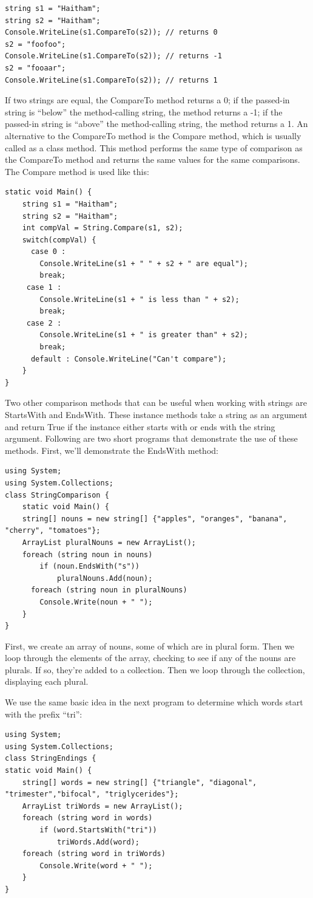 \documentclass[12pt,a4paper,final,twoside,titlepage]{book}
\begin{document}
\begin{lstlisting}
string s1 = "Haitham";
string s2 = "Haitham";
Console.WriteLine(s1.CompareTo(s2)); // returns 0
s2 = "foofoo";
Console.WriteLine(s1.CompareTo(s2)); // returns -1
s2 = "fooaar";
Console.WriteLine(s1.CompareTo(s2)); // returns 1
\end{lstlisting}
If two strings are equal, the CompareTo method returns a 0; if the passed-in string is “below” the method-calling string, the method returns a -1; if the passed-in string is “above” the method-calling string, the method returns a 1.
An alternative to the CompareTo method is the Compare method, which is usually called as a class method. This method performs the same type of comparison as the CompareTo method and returns the same values for the same comparisons. The Compare method is used like this:
\begin{lstlisting}
static void Main() {
	string s1 = "Haitham";
	string s2 = "Haitham";
	int compVal = String.Compare(s1, s2); 
	switch(compVal) {
      case 0 : 
      	Console.WriteLine(s1 + " " + s2 + " are equal");
      	break;
     case 1 : 
     	Console.WriteLine(s1 + " is less than " + s2);
     	break;
     case 2 : 
     	Console.WriteLine(s1 + " is greater than" + s2);
        break;
      default : Console.WriteLine("Can't compare");
	}
}
\end{lstlisting}
Two other comparison methods that can be useful when working with strings are StartsWith and EndsWith. These instance methods take a string as an argument and return True if the instance either starts with or ends with the string argument.
Following are two short programs that demonstrate the use of these methods. First, we’ll demonstrate the EndsWith method:
\begin{lstlisting}
using System;
using System.Collections;
class StringComparison {
	static void Main() {
	string[] nouns = new string[] {"apples", "oranges", "banana", "cherry", "tomatoes"}; 
	ArrayList pluralNouns = new ArrayList();
	foreach (string noun in nouns)
		if (noun.EndsWith("s"))
            pluralNouns.Add(noun);
      foreach (string noun in pluralNouns)
        Console.Write(noun + " ");
	}
}
\end{lstlisting}
First, we create an array of nouns, some of which are in plural form. Then we loop through the elements of the array, checking to see if any of the nouns are plurals. If so, they’re added to a collection. Then we loop through the collection, displaying each plural.

We use the same basic idea in the next program to determine which words start with the prefix “tri”:
\begin{lstlisting}
using System;
using System.Collections;
class StringEndings {
static void Main() {
	string[] words = new string[] {"triangle", "diagonal", "trimester","bifocal", "triglycerides"};
	ArrayList triWords = new ArrayList();
	foreach (string word in words)
  		if (word.StartsWith("tri"))
     		triWords.Add(word);
	foreach (string word in triWords)
  		Console.Write(word + " ");
	}
}
\end{lstlisting}
\end{document}
